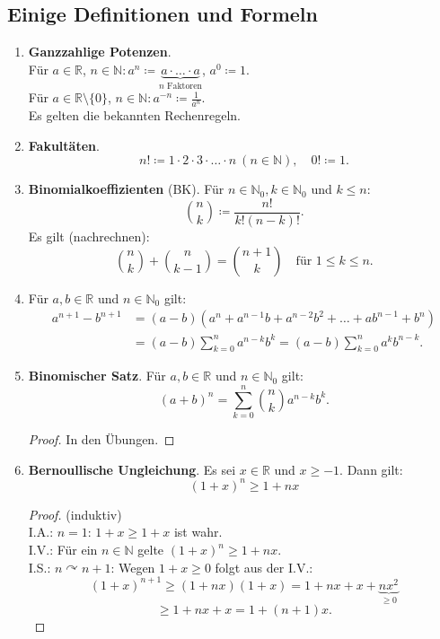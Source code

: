 \documentclass[12pt]{extreport} %
\newcommand{\N}{\mathbb{N}}
\newcommand{\R}{\mathbb{R}}
\theoremstyle{named}
\theoremstyle{itshape}
\theoremstyle{normal}
\begin{document}
\subsection*{Einige Definitionen und Formeln} 
\begin{enumerate}
	\item \textbf{Ganzzahlige Potenzen}.\\ Für $a \in \R$, $n \in \N: a^{n} \coloneqq \underbrace{a \cdot \dotsc \cdot a}_{n \text{ Faktoren}}$, $a^{0} \coloneqq 1$. \\ 
	        Für $a \in \R\setminus \{0\}$, $n \in \N: a^{-n} \coloneqq \frac{1}{a^{n}}$. \\
		Es gelten die bekannten Rechenregeln.
	\item \textbf{Fakultäten}. 
	        $$ n! \coloneqq 1 \cdot 2 \cdot 3 \cdot \dotsc \cdot n ~ (n \in \N), \quad 0! \coloneqq 1.$$
	\item \textbf{Binomialkoeffizienten} (BK). Für $n \in \N_{0}, k \in \N_{0}$ und $k \leq n$:
		$$ \binom{n}{k} \coloneqq \frac{n!}{k!(n - k)!}. $$
		Es gilt (nachrechnen):
		$$ \binom{n}{k} + \binom{n}{k - 1} = \binom{n + 1}{k} \quad \text{für } 1 \leq k \leq n. $$
	\item Für $a, b \in \R$ und $n \in \N_0$ gilt: 
		\begin{align*}
			a^{n + 1} - b^{n + 1} & = (a - b) \left(a^{n} + a^{n-1}b + a^{n-2}b^{2} + \dotsc + a b^{n-1} + b^{n} \right) \\
				& = (a - b) \sum_{k = 0}^{n} a^{n -k}b^{k} = (a - b) \sum_{k = 0}^{n} a^{k}b^{n-k}.
		\end{align*}
	\item \textbf{Binomischer Satz}. Für $a, b \in \R$ und $n \in \N_0$ gilt: $$(a + b)^{n} = \sum_{k = 0}^{n} \binom{n}{k} a^{n-k}b^{k}.$$
		\begin{proof}
			In den Übungen.
		\end{proof}
	\item \textbf{Bernoullische Ungleichung}. Es sei $x \in \R$ und $x \geq -1$. Dann gilt:
		$$ (1 + x)^{n} \geq 1 + n x$$
		\begin{proof}(induktiv) \\
			I.A.: $n = 1$: $1 + x \geq 1 + x$ ist wahr.\\
			I.V.: Für ein $n \in \N$ gelte $(1 + x)^{n} \geq 1 + nx$. \\
			I.S.: $n \curvearrowright n + 1$: Wegen $1 + x \geq 0$ folgt aus der I.V.:
			$$
			(1 + x)^{n + 1}  \geq (1 + nx)(1 + x)  = 1 + nx + x + \underbrace{nx^{2}}_{\geq 0} 
			$$
			$$
			 \geq 1 + nx + x  = 1 + (n + 1)x.
			$$
		\end{proof}
\end{enumerate}
\end{document}
